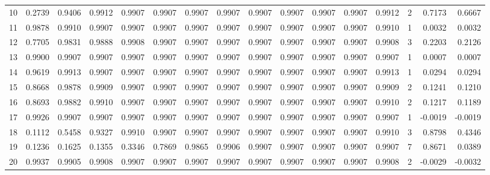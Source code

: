 \begin{tabular}{lrrrrrrrrrrrrrrr}
10  &      0.2739 &  0.9406 &  0.9912 &  0.9907 &  0.9907 &  0.9907 &  0.9907 &  0.9907 &  0.9907 &  0.9907 &   0.9907 &     0.9912 &      2 &                    0.7173 &                     0.6667 \\
11  &      0.9878 &  0.9910 &  0.9907 &  0.9907 &  0.9907 &  0.9907 &  0.9907 &  0.9907 &  0.9907 &  0.9907 &   0.9907 &     0.9910 &      1 &                    0.0032 &                     0.0032 \\
12  &      0.7705 &  0.9831 &  0.9888 &  0.9908 &  0.9907 &  0.9907 &  0.9907 &  0.9907 &  0.9907 &  0.9907 &   0.9907 &     0.9908 &      3 &                    0.2203 &                     0.2126 \\
13  &      0.9900 &  0.9907 &  0.9907 &  0.9907 &  0.9907 &  0.9907 &  0.9907 &  0.9907 &  0.9907 &  0.9907 &   0.9907 &     0.9907 &      1 &                    0.0007 &                     0.0007 \\
14  &      0.9619 &  0.9913 &  0.9907 &  0.9907 &  0.9907 &  0.9907 &  0.9907 &  0.9907 &  0.9907 &  0.9907 &   0.9907 &     0.9913 &      1 &                    0.0294 &                     0.0294 \\
15  &      0.8668 &  0.9878 &  0.9909 &  0.9907 &  0.9907 &  0.9907 &  0.9907 &  0.9907 &  0.9907 &  0.9907 &   0.9907 &     0.9909 &      2 &                    0.1241 &                     0.1210 \\
16  &      0.8693 &  0.9882 &  0.9910 &  0.9907 &  0.9907 &  0.9907 &  0.9907 &  0.9907 &  0.9907 &  0.9907 &   0.9907 &     0.9910 &      2 &                    0.1217 &                     0.1189 \\
17  &      0.9926 &  0.9907 &  0.9907 &  0.9907 &  0.9907 &  0.9907 &  0.9907 &  0.9907 &  0.9907 &  0.9907 &   0.9907 &     0.9907 &      1 &                   -0.0019 &                    -0.0019 \\
18  &      0.1112 &  0.5458 &  0.9327 &  0.9910 &  0.9907 &  0.9907 &  0.9907 &  0.9907 &  0.9907 &  0.9907 &   0.9907 &     0.9910 &      3 &                    0.8798 &                     0.4346 \\
19  &      0.1236 &  0.1625 &  0.1355 &  0.3346 &  0.7869 &  0.9865 &  0.9906 &  0.9907 &  0.9907 &  0.9907 &   0.9907 &     0.9907 &      7 &                    0.8671 &                     0.0389 \\
20  &      0.9937 &  0.9905 &  0.9908 &  0.9907 &  0.9907 &  0.9907 &  0.9907 &  0.9907 &  0.9907 &  0.9907 &   0.9907 &     0.9908 &      2 &                   -0.0029 &                    -0.0032 \\

\end{tabular}
